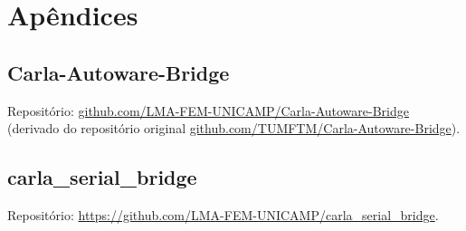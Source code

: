 \thispagestyle{plain}
\section*{Apêndices}

\subsection*{Carla-Autoware-Bridge}

Repositório: \url{github.com/LMA-FEM-UNICAMP/Carla-Autoware-Bridge} (derivado do repositório original \url{github.com/TUMFTM/Carla-Autoware-Bridge}).

\subsection*{carla\_serial\_bridge}

Repositório: \url{https://github.com/LMA-FEM-UNICAMP/carla_serial_bridge}.